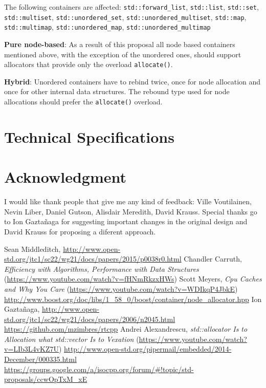 \documentclass[11pt]{article}
\begin{document}
The following containers are affected: \texttt{std::forward\_list},
\texttt{std::list}, \texttt{std::set}, \texttt{std::multiset},
\texttt{std::unordered\_set}, \texttt{std::unordered\_multiset},
\texttt{std::map}, \texttt{std::multimap},
\texttt{std::unordered\_map}, \texttt{std::unordered\_multimap}

\medskip
\noindent
{\bf Pure node-based}: As a result of this proposal all node based
containers mentioned above, with the exception of the unordered ones,
should support allocators that provide only the overload
\texttt{allocate()}.

\medskip
\noindent
{\bf Hybrid}: Unordered containers have to rebind twice, once
for node allocation and once for other internal data structures.
The rebound type used for node allocations should prefer the 
\texttt{allocate()} overload.

\section{Technical Specifications}

\section{Acknowledgment}

I would like thank people that give me any kind of feedback: Ville Voutilainen,
Nevin Liber, Daniel Gutson, Alisdair Meredith, David Krauss. Special thanks go
to Ion Gaztañaga for suggesting important changes in the original design and David 
Krauss for proposing a diferent approach.

\begin{thebibliography}{9}

   Sean Middleditch, \url{http://www.open-std.org/jtc1/sc22/wg21/docs/papers/2015/p0038r0.html}
   Chandler Carruth, {\it Efficiency with Algorithms, Performance
  with Data Structures} (\url{https://www.youtube.com/watch?v=fHNmRkzxHWs})
   Scott Meyers, {\it Cpu Caches and Why You Care} (\url{https://www.youtube.com/watch?v=WDIkqP4JbkE})
   \url{http://www.boost.org/doc/libs/1_58_0/boost/container/node_allocator.hpp}
   Ion Gazta\~ naga, \url{http://www.open-std.org/jtc1/sc22/wg21/docs/papers/2006/n2045.html}
   \url{https://github.com/mzimbres/rtcpp}
   Andrei Alexandrescu, {\it std::allocator Is to Allocation what
  std::vector Is to Vexation} (\url{https://www.youtube.com/watch?v=LIb3L4vKZ7U})
   \url{http://www.open-std.org/pipermail/embedded/2014-December/000335.html}
   \url{https://groups.google.com/a/isocpp.org/forum/#!topic/std-proposals/ccwOpTxM_xE}

\end{thebibliography}
\end{document}

